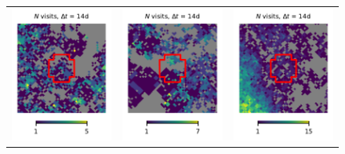 \documentclass[preprintm,linenumbers]{aastex631}
\begin{document}
\begin{figure}
\begin{tabular}{  c c c}
				\includegraphics{results/skymaps_cutout/skymaps_cutout_first_year_one_snap_v4_0_10yrs_db_noDD_noTwi_tscale-14_nside-256_doAllTemplateMetrics_reduceCount_g_NES_noDD_noTwi.pdf} &
				\includegraphics{results/skymaps_cutout/skymaps_cutout_first_year_one_snap_v4_0_10yrs_db_noDD_noTwi_tscale-14_nside-256_doAllTemplateMetrics_reduceCount_g_WFD_noDD_noTwi.pdf} &
				\includegraphics{results/skymaps_cutout/skymaps_cutout_first_year_one_snap_v4_0_10yrs_db_noDD_noTwi_tscale-14_nside-256_doAllTemplateMetrics_reduceCount_g_GP_noDD_noTwi.pdf} \\

\end{tabular}
\end{figure}
\end{document}
